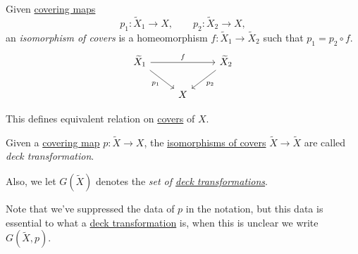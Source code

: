\begin{definition}\label{def:isomorphism-of-covers}
	Given \hyperref[def:covering-map]{covering maps}
	\[
		p_1\colon \widetilde{X} _1\to X,\qquad p_2\colon \widetilde{X} _2\to X,
	\]
	an \emph{isomorphism of covers} is a homeomorphism \(f\colon \widetilde{X} _1\to \widetilde{X} _2\) such that \(p_1 = p_2\circ f\).
	\[
		\begin{tikzcd}
			{\widetilde{X}_1} && {\widetilde{X}_2} \\
			& X
			\arrow["{p_1}"', from=1-1, to=2-2]
			\arrow["{p_2}", from=1-3, to=2-2]
			\arrow["f", from=1-1, to=1-3]
		\end{tikzcd}
	\]
\end{definition}

\begin{exercise}
	This defines equivalent relation on \hyperref[def:isomorphism-of-covers]{covers} of \(X\).
\end{exercise}

\begin{definition}\label{def:deck-transformation}
	Given a \hyperref[def:covering-map]{covering map} \(p\colon \widetilde{X} \to X\), the  \hyperref[def:isomorphism-of-covers]{isomorphisms of covers} \(\widetilde{X} \to \widetilde{X} \) are called \emph{deck transformation}.

	\begin{definition}\label{def:set-of-deck-transformation}
		Also, we let \(G(\widetilde{X} )\) denotes the \emph{set of \hyperref[def:deck-transformation]{deck transformations}}.
	\end{definition}
\end{definition}

\begin{note}
	Note that we've suppressed the data of \(p\) in the notation, but this data is essential to what a \hyperref[def:deck-transformation]{deck transformation}
	is, when this is unclear we write \(G(\widetilde{X} , p)\).
\end{note}